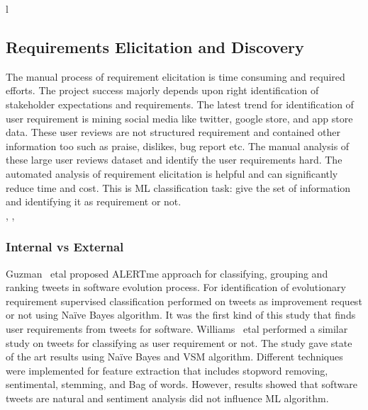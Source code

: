 l\subsection{Requirements Elicitation and Discovery} The manual process of
requirement elicitation is time consuming and required efforts. The project
success majorly depends upon right identification of stakeholder expectations
and requirements. The latest trend for identification of user requirement is
mining social media like twitter, google store, and app store data. These user
reviews are not structured requirement and contained other information too such
as praise, dislikes, bug report etc. The manual analysis of these large user
reviews dataset and identify the user requirements hard. The automated analysis
of requirement elicitation is helpful and can significantly reduce time and
cost. This is ML classification task: give the set of information and
identifying it as requirement or not.\\

\cite{Cleland-Huang:2008}, \cite{Kaiya:2010}, \cite{Castro-Herrera:2009}
\subsubsection{Internal vs External}

Guzman ~etal \cite{Guzman:2017} proposed ALERTme approach for classifying,
grouping and ranking tweets in software evolution process. For identification of
evolutionary requirement supervised classification performed on tweets as
improvement request or not using Naïve Bayes algorithm. It was the first kind of
this study that finds user requirements from tweets for software. Williams ~etal
 \cite{Williams:2017} performed a similar study on
tweets for classifying as user requirement or not. The study gave state of the art results using Naïve Bayes
and VSM algorithm. Different techniques were implemented for feature extraction
that includes stopword removing, sentimental, stemming, and Bag of words.
However, results showed that software tweets are natural  and sentiment analysis did not influence ML algorithm.\\


